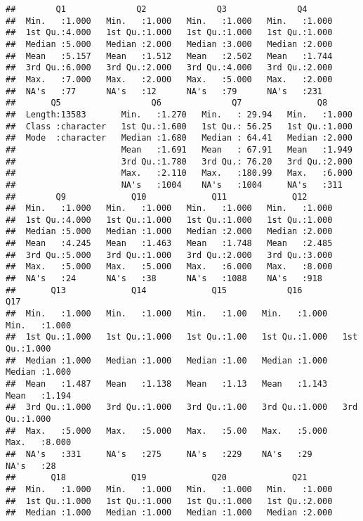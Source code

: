 \documentclass[
]{article}
\begin{document}
\begin{verbatim}
##        Q1              Q2              Q3              Q4       
##  Min.   :1.000   Min.   :1.000   Min.   :1.000   Min.   :1.000  
##  1st Qu.:4.000   1st Qu.:1.000   1st Qu.:1.000   1st Qu.:1.000  
##  Median :5.000   Median :2.000   Median :3.000   Median :2.000  
##  Mean   :5.157   Mean   :1.512   Mean   :2.502   Mean   :1.744  
##  3rd Qu.:6.000   3rd Qu.:2.000   3rd Qu.:4.000   3rd Qu.:2.000  
##  Max.   :7.000   Max.   :2.000   Max.   :5.000   Max.   :2.000  
##  NA's   :77      NA's   :12      NA's   :79      NA's   :231    
##       Q5                  Q6              Q7               Q8       
##  Length:13583       Min.   :1.270   Min.   : 29.94   Min.   :1.000  
##  Class :character   1st Qu.:1.600   1st Qu.: 56.25   1st Qu.:1.000  
##  Mode  :character   Median :1.680   Median : 64.41   Median :2.000  
##                     Mean   :1.691   Mean   : 67.91   Mean   :1.949  
##                     3rd Qu.:1.780   3rd Qu.: 76.20   3rd Qu.:2.000  
##                     Max.   :2.110   Max.   :180.99   Max.   :6.000  
##                     NA's   :1004    NA's   :1004     NA's   :311    
##        Q9             Q10             Q11             Q12       
##  Min.   :1.000   Min.   :1.000   Min.   :1.000   Min.   :1.000  
##  1st Qu.:4.000   1st Qu.:1.000   1st Qu.:1.000   1st Qu.:1.000  
##  Median :5.000   Median :1.000   Median :2.000   Median :2.000  
##  Mean   :4.245   Mean   :1.463   Mean   :1.748   Mean   :2.485  
##  3rd Qu.:5.000   3rd Qu.:1.000   3rd Qu.:2.000   3rd Qu.:3.000  
##  Max.   :5.000   Max.   :5.000   Max.   :6.000   Max.   :8.000  
##  NA's   :24      NA's   :38      NA's   :1088    NA's   :918    
##       Q13             Q14             Q15            Q16             Q17       
##  Min.   :1.000   Min.   :1.000   Min.   :1.00   Min.   :1.000   Min.   :1.000  
##  1st Qu.:1.000   1st Qu.:1.000   1st Qu.:1.00   1st Qu.:1.000   1st Qu.:1.000  
##  Median :1.000   Median :1.000   Median :1.00   Median :1.000   Median :1.000  
##  Mean   :1.487   Mean   :1.138   Mean   :1.13   Mean   :1.143   Mean   :1.194  
##  3rd Qu.:1.000   3rd Qu.:1.000   3rd Qu.:1.00   3rd Qu.:1.000   3rd Qu.:1.000  
##  Max.   :5.000   Max.   :5.000   Max.   :5.00   Max.   :5.000   Max.   :8.000  
##  NA's   :331     NA's   :275     NA's   :229    NA's   :29      NA's   :28     
##       Q18             Q19             Q20             Q21       
##  Min.   :1.000   Min.   :1.000   Min.   :1.000   Min.   :1.000  
##  1st Qu.:1.000   1st Qu.:1.000   1st Qu.:1.000   1st Qu.:2.000  
##  Median :1.000   Median :1.000   Median :1.000   Median :2.000  

\end{verbatim}
\end{document}
